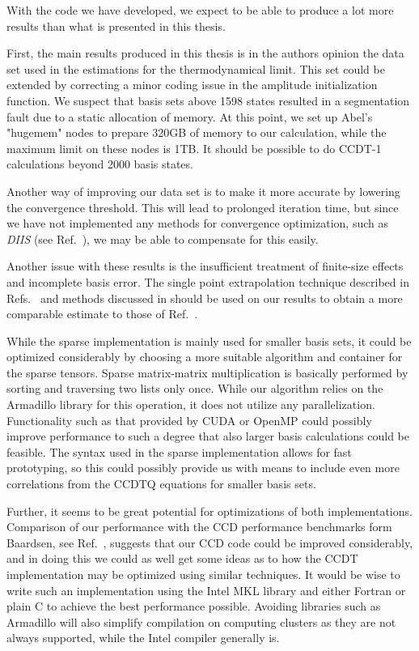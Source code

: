 With the code we have developed, we expect to be able to produce a lot
more results than what is presented in this thesis.

First, the main results produced in this thesis is in the authors
opinion the data set used in the estimations for the thermodynamical
limit. This set could be extended by correcting a minor coding issue
in the amplitude initialization function. We suspect that basis sets
above 1598 states resulted in a segmentation fault due to a static
allocation of memory. At this point, we set up Abel's "hugemem" nodes
to prepare 320GB of memory to our calculation, while the maximum limit
on these nodes is 1TB. It should be possible to do CCDT-1 calculations
beyond 2000 basis states.

Another way of improving our data set is to make it more accurate by
lowering the convergence threshold. This will lead to prolonged
iteration time, but since we have not implemented any methods for
convergence optimization, such as \emph{DIIS} (see
Ref.~\cite{scuseria1986}), we may be able to compensate for this
easily.

Another issue with these results is the insufficient treatment of
finite-size effects and incomplete basis error. The single point
extrapolation technique described in Refs.~\cite{Shepherd2012} and
methods discussed in \cite{Drummond2007} should be used on our results
to obtain a more comparable estimate to those of
Ref.~\cite{Shepherd2013}.

While the sparse implementation is mainly used for smaller basis sets,
it could be optimized considerably by choosing a more suitable
algorithm and container for the sparse tensors. Sparse matrix-matrix
multiplication is basically performed by sorting and traversing two
lists only once. While our algorithm relies on the Armadillo library
for this operation, it does not utilize any
parallelization. Functionality such as that provided by CUDA
\cite{cuda} or OpenMP \cite{openmp} could possibly improve performance
to such a degree that also larger basis calculations could be
feasible. The syntax used in the sparse implementation allows for fast
prototyping, so this could possibly provide us with means to include
even more correlations from the CCDTQ equations for smaller basis
sets.

Further, it seems to be great potential for optimizations of both
implementations. Comparison of our performance with the CCD
performance benchmarks form Baardsen, see Ref.~\cite{Baardsen2015},
suggests that our CCD code could be improved considerably, and in doing
this we could as well get some ideas as to how the CCDT
implementation may be optimized using similar techniques. It would be
wise to write such an implementation using the Intel MKL library and
either Fortran or plain C to achieve the best performance
possible. Avoiding libraries such as Armadillo will also simplify
compilation on computing clusters as they are not always supported,
while the Intel compiler generally is.

